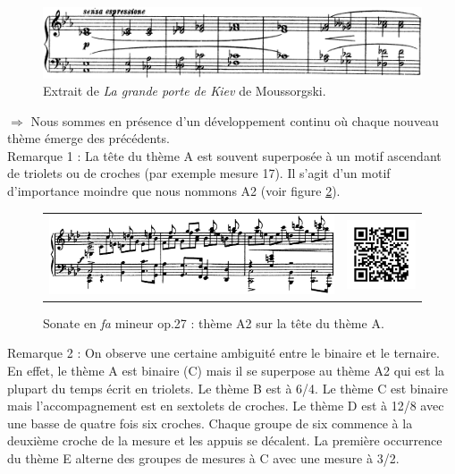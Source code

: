 \begin{figure}[!p]
  \begin{bigcenter}
    \includegraphics[width=15cm, keepaspectratio]{kiev.png}
  \end{bigcenter}
  \caption{\label{grande-porte-de-kiev}Extrait de \emph{La grande porte de Kiev} de Moussorgski.}
\end{figure}

$\Rightarrow$ Nous sommes en présence d'un développement continu où chaque nouveau thème émerge des précédents.\\

Remarque 1 : La tête du thème A est souvent superposée à un motif ascendant de triolets ou de croches (par exemple mesure 17). Il s'agit d'un motif d'importance moindre que nous nommons A2 (voir figure \ref{sonate-theme-12}).\\

\begin{figure}[!ht]
  \begin{bigcenter}
    \begin{tabular}{lr}
      \includegraphics[width=12.5cm, keepaspectratio]{sonate-theme-A2.png}
      &
      \includegraphics[width=3cm, keepaspectratio]{op1-qr.png}
    \end{tabular}
  \end{bigcenter}
  \caption{\label{sonate-theme-12}Sonate en \emph{fa} mineur op.27 : thème A2 sur la tête du thème A.}
\end{figure}

Remarque 2 : On observe une certaine ambiguité entre le binaire et le ternaire. En effet, le thème A est binaire (C) mais il se superpose au thème A2 qui est la plupart du temps écrit en triolets. Le thème B est à 6/4. Le thème C est binaire mais l'accompagnement est en sextolets de croches. Le thème D est à 12/8 avec une basse de quatre fois six croches. Chaque groupe de six commence à la deuxième croche de la mesure et les appuis se décalent. La première occurrence du thème E alterne des groupes de mesures à C avec une mesure à 3/2.

